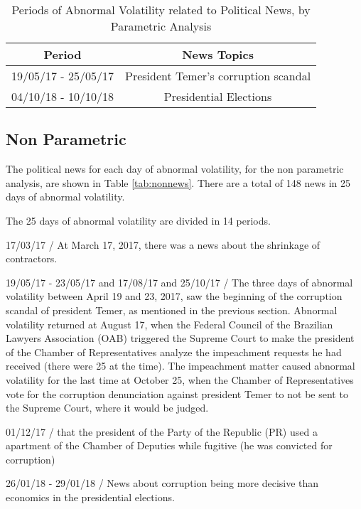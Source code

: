 \documentclass[a4paper]{article}
\begin{document}
\begin{table}[H]
\caption{Periods of Abnormal Volatility related to Political News, by Parametric Analysis}
\label{tab:respar}
\centering
\begin{tabular}{| c | c |}
\hline
Period & News Topics \\
\hline \hline
19/05/17 - 25/05/17 & President Temer's corruption scandal \\
\hline
04/10/18 - 10/10/18 & Presidential Elections \\
\hline
\end{tabular}
\end{table}


\subsection{Non Parametric}

The political news for each day of abnormal volatility, for the non parametric analysis, are shown in Table \ref{tab:nonnews}. There are a total of 148 news in 25 days of abnormal volatility.



The 25 days of abnormal volatility are divided in 14 periods.

17/03/17 / At March 17, 2017, there was a news about the shrinkage of contractors.

19/05/17 - 23/05/17 and 17/08/17 and 25/10/17 / The three days of abnormal volatility between April 19 and 23, 2017, saw the beginning of the corruption scandal of president Temer, as mentioned in the previous section. Abnormal volatility returned at August 17, when the Federal Council of the Brazilian Lawyers Association (OAB) triggered the Supreme Court to make the president of the Chamber of Representatives analyze the impeachment requests he had received (there were 25 at the time). The impeachment matter caused abnormal volatility for the last time at October 25, when the Chamber of Representatives vote for the corruption denunciation against president Temer to not be sent to the Supreme Court, where it would be judged.

01/12/17 / that the president of the Party of the Republic (PR) used a apartment of the Chamber of Deputies while fugitive (he was convicted for corruption)

26/01/18 - 29/01/18 / News about corruption being more decisive than economics in the presidential elections.
\end{document}
